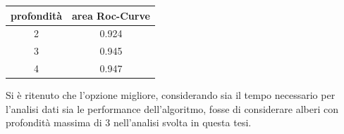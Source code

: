 \begin{itemize}
	\begin{table}[H]
		\centering
		\begin{tabular}{c|c}
		    \toprule
		    profondità  &  area Roc-Curve  \\
            \midrule
           	 2 &   0.924  \\ 
             3 &   0.945 \\
             4 &   0.947 \\ 
			\bottomrule
		\end{tabular}
	\end{table}
    Si è ritenuto che l'opzione migliore, considerando sia il tempo necessario per l'analisi dati sia le performance dell'algoritmo, fosse di considerare alberi con profondità massima di 3 nell'analisi svolta in questa tesi.
    \end{itemize}

